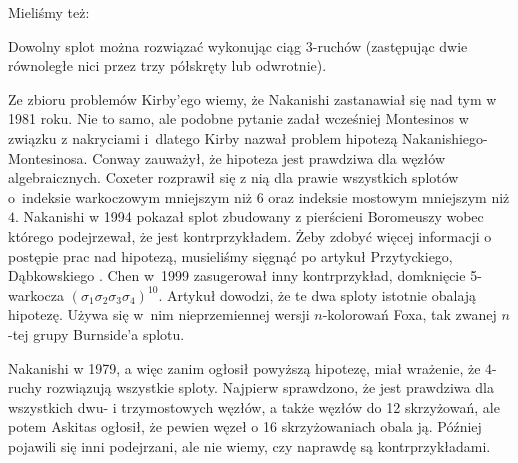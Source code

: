 Mieliśmy też:

\begin{conjecture}
    Dowolny splot można rozwiązać wykonując ciąg 3-ruchów (zastępując dwie równoległe nici przez trzy półskręty lub odwrotnie).
\end{conjecture}

Ze zbioru problemów Kirby'ego \cite{kirby1978} wiemy, że Nakanishi zastanawiał się nad tym w 1981 roku.
%
Nie to samo, ale podobne pytanie zadał wcześniej Montesinos w związku z nakryciami i~dlatego Kirby nazwał problem hipotezą Nakanishiego-Montesinosa.
%
Conway zauważył, że hipoteza jest prawdziwa dla węzłów algebraicznych.
%
Coxeter rozprawił się z nią dla prawie wszystkich splotów o~indeksie warkoczowym mniejszym niż $6$ oraz indeksie mostowym mniejszym niż $4$.
%
Nakanishi w 1994 pokazał splot zbudowany z pierścieni Boromeuszy wobec którego podejrzewał, że jest kontrprzykładem.
%
Żeby zdobyć więcej informacji o postępie prac nad hipotezą, musieliśmy sięgnąć po artykuł Przytyckiego, Dąbkowskiego \cite{dabkowski2002}.
%
%
Chen w~1999 zasugerował inny kontrprzykład, domknięcie 5-warkocza $(\sigma_1\sigma_2\sigma_3\sigma_4)^{10}$.
%
Artykuł \cite{dabkowski2002} dowodzi, że te dwa sploty istotnie obalają hipotezę.
Używa się w~nim nieprzemiennej wersji $n$-kolorowań Foxa, tak zwanej $n$-tej grupy Burnside'a splotu.
%
%

Nakanishi w 1979, a więc zanim ogłosił powyższą hipotezę, miał wrażenie, że $4$-ruchy rozwiązują wszystkie sploty.
Najpierw sprawdzono, że jest prawdziwa dla wszystkich dwu- i trzymostowych węzłów, a także węzłów do 12 skrzyżowań, ale potem Askitas ogłosił, że pewien węzeł o 16 skrzyżowaniach obala ją.
%
Później pojawili się inni podejrzani, ale nie wiemy, czy naprawdę są kontrprzykładami.


%



